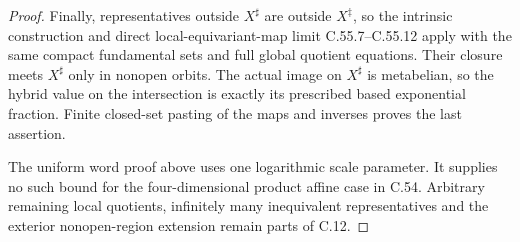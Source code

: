\begin{proof}
Finally, representatives outside $X^\sharp$
are outside $X^\ddagger$, so the intrinsic
construction and direct local-equivariant-map
limit C.55.7--C.55.12 apply with the same
compact fundamental sets and full global
quotient equations.
Their closure meets $X^\sharp$ only in
nonopen orbits. The actual image on
$X^\sharp$ is metabelian, so the hybrid
value on the intersection is exactly its
prescribed based exponential fraction.
Finite closed-set pasting of the maps and
inverses proves the last assertion.

The uniform word proof above uses one
logarithmic scale parameter. It supplies no
such bound for the four-dimensional product
affine case in C.54. Arbitrary remaining
local quotients, infinitely many inequivalent
representatives and the exterior nonopen-region
extension remain parts of C.12.
\end{proof}
